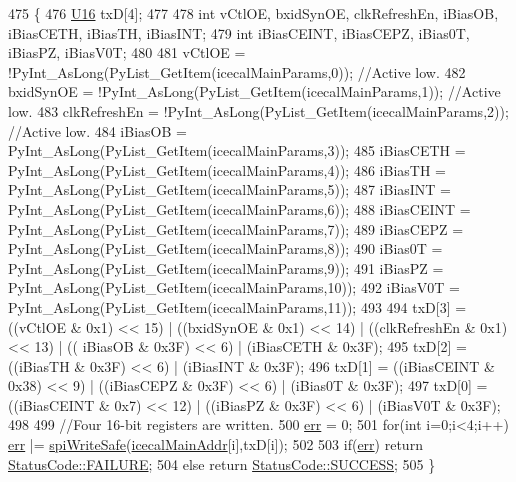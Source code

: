 \begin{DoxyCode}
475 \{                            
476     \hyperlink{ICECALv3_8h_adf928e51a60dba0df29d615401cc55a8}{U16} txD[4];
477 
478     \textcolor{keywordtype}{int} vCtlOE, bxidSynOE, clkRefreshEn, iBiasOB, iBiasCETH, iBiasTH, iBiasINT;
479     \textcolor{keywordtype}{int} iBiasCEINT, iBiasCEPZ, iBias0T, iBiasPZ, iBiasV0T;
480     
481     vCtlOE              = !PyInt\_AsLong(PyList\_GetItem(icecalMainParams,0));    \textcolor{comment}{//Active low.}
482     bxidSynOE       = !PyInt\_AsLong(PyList\_GetItem(icecalMainParams,1));    \textcolor{comment}{//Active low.}
483     clkRefreshEn    = !PyInt\_AsLong(PyList\_GetItem(icecalMainParams,2));    \textcolor{comment}{//Active low.}
484     iBiasOB         = PyInt\_AsLong(PyList\_GetItem(icecalMainParams,3));
485     iBiasCETH           = PyInt\_AsLong(PyList\_GetItem(icecalMainParams,4));
486     iBiasTH             = PyInt\_AsLong(PyList\_GetItem(icecalMainParams,5));
487     iBiasINT            = PyInt\_AsLong(PyList\_GetItem(icecalMainParams,6));
488     iBiasCEINT      = PyInt\_AsLong(PyList\_GetItem(icecalMainParams,7));
489     iBiasCEPZ       = PyInt\_AsLong(PyList\_GetItem(icecalMainParams,8));
490     iBias0T             = PyInt\_AsLong(PyList\_GetItem(icecalMainParams,9));
491     iBiasPZ             = PyInt\_AsLong(PyList\_GetItem(icecalMainParams,10));
492     iBiasV0T        = PyInt\_AsLong(PyList\_GetItem(icecalMainParams,11));
493 
494     txD[3] = ((vCtlOE & 0x1) << 15)         | ((bxidSynOE & 0x1) << 14) | ((clkRefreshEn & 0x1) << 13) | ((
      iBiasOB & 0x3F) << 6) | (iBiasCETH & 0x3F);
495     txD[2] = ((iBiasTH & 0x3F) << 6)        |  (iBiasINT  & 0x3F); 
496     txD[1] = ((iBiasCEINT & 0x38) << 9) | ((iBiasCEPZ & 0x3F) << 6) |  (iBias0T      & 0x3F);
497     txD[0] = ((iBiasCEINT & 0x7) << 12) | ((iBiasPZ   & 0x3F) << 6) |  (iBiasV0T     & 0x3F);
498 
499     \textcolor{comment}{//Four 16-bit registers are written.}
500     \hyperlink{classICECALv3_ad8989925ee5b3ff322d863ce6aaff0bd}{err} = 0;
501     \textcolor{keywordflow}{for}(\textcolor{keywordtype}{int} i=0;i<4;i++) \hyperlink{classICECALv3_ad8989925ee5b3ff322d863ce6aaff0bd}{err} |= \hyperlink{classICECALv3_aa0b8358ea0be8e47a8aded5e1551787f}{spiWriteSafe}(\hyperlink{ICECALv3_8h_a9c22ae782814495416dc2b803df326c1}{icecalMainAddr}[i],txD[i]);
502 
503     \textcolor{keywordflow}{if}(\hyperlink{classICECALv3_ad8989925ee5b3ff322d863ce6aaff0bd}{err}) \textcolor{keywordflow}{return} \hyperlink{classStatusCode_a6f565cbeadc76d14c72f047e5e85eb4ba3da73d4c469762eb9d3c960368252b26}{StatusCode::FAILURE};
504     \textcolor{keywordflow}{else}        \textcolor{keywordflow}{return} \hyperlink{classStatusCode_a6f565cbeadc76d14c72f047e5e85eb4badd0da38d3ba0d922efd1f4619bc37ad8}{StatusCode::SUCCESS};
505 \}
\end{DoxyCode}
\mbox{\label{classObject_ae30fea75683c2d149b6b6d17c09ecd0c}} 
